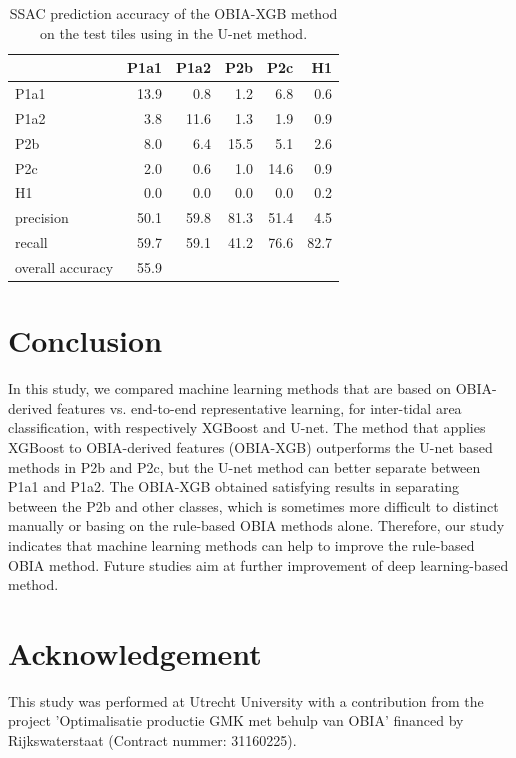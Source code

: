 \documentclass{isprs} %
\begin{document}
\begin{table}[]
    \centering
\begin{tabular}{lrrrrr}
\toprule
{} &  P1a1 &  P1a2 &  P2b &  P2c &   H1 \\
\midrule
P1a1             &  13.9 &   0.8 &  1.2 &  6.8 &  0.6 \\
P1a2             &   3.8 &  11.6 &  1.3 &  1.9 &  0.9 \\
P2b              &   8.0 &   6.4 & 15.5 &  5.1 &  2.6 \\
P2c              &   2.0 &   0.6 &  1.0 & 14.6 &  0.9 \\
H1               &   0.0 &   0.0 &  0.0 &  0.0 &  0.2 \\
precision        &  50.1 &  59.8 & 81.3 & 51.4 &  4.5 \\
recall           &  59.7 &  59.1 & 41.2 & 76.6 & 82.7 \\
overall accuracy &  55.9 &       &      &      &      \\
\bottomrule
\end{tabular}
    \caption{SSAC prediction accuracy of the OBIA-XGB method on the test tiles using in the U-net method. }
    \label{tab:xgb_unettile}
\end{table}
 
 
\section{Conclusion}

In this study, we compared machine learning methods that are based on OBIA-derived features vs. end-to-end representative learning, for inter-tidal area classification, with respectively XGBoost and U-net. The method that applies XGBoost to OBIA-derived features (OBIA-XGB) outperforms the U-net based methods in P2b and P2c, but the U-net method can better separate between P1a1 and P1a2. The OBIA-XGB obtained satisfying results in separating between the P2b and other classes, which is sometimes more difficult to distinct manually or basing on the rule-based OBIA methods alone. Therefore, our study indicates that machine learning methods can help to improve the rule-based OBIA method. Future studies aim at further improvement of deep learning-based method.



\section{Acknowledgement}

This study was performed at Utrecht University with a contribution from the project 'Optimalisatie productie GMK met behulp van OBIA' financed by Rijkswaterstaat (Contract nummer: 31160225). 


%

\end{document}
